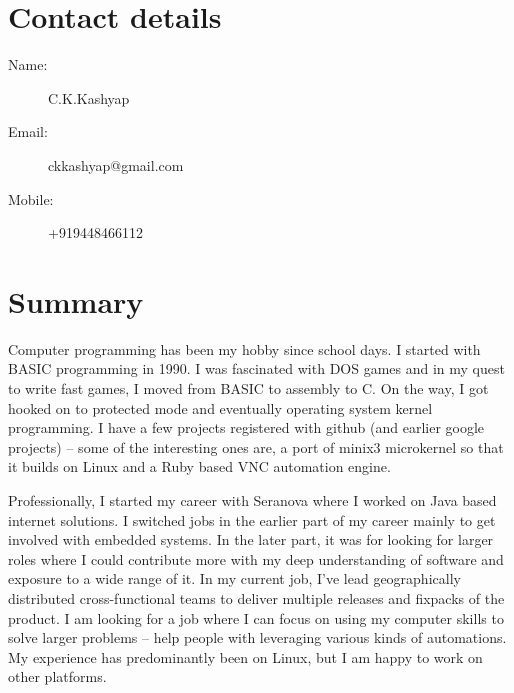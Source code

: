 \documentclass [a4paper,11pt] {article}
\begin{document}
\section*{Contact details}
\begin{description}
\item[Name:] C.K.Kashyap
\item[Email:] ckkashyap@gmail.com
\item[Mobile:] +919448466112
\end{description}

\section*{Summary}
Computer programming has been my hobby since school days. I started with BASIC
programming in 1990. I was fascinated with DOS games and in my quest to write
fast games, I moved from BASIC to assembly to C. On the way, I got hooked on to
protected mode and eventually operating system kernel programming. I have a few
projects registered with github (and earlier google projects) –  some of the
interesting ones are, a port of minix3 microkernel so that it builds on Linux
and a Ruby based VNC automation engine.

Professionally, I started my career with Seranova where I worked on Java based
internet solutions. I switched jobs in the earlier part of my career mainly to
get involved with embedded systems.  In the later part, it was for looking for
larger roles where I could contribute more with my deep understanding of
software and exposure to a wide range of it.  In my current job, I’ve lead
geographically distributed cross-functional teams to deliver multiple releases
and fixpacks of the product. I am looking for a job where I can focus on using
my computer skills to solve larger problems – help people with leveraging
various kinds of automations. My experience has predominantly been on Linux,
but I am happy to work on other platforms.
\end{document}
